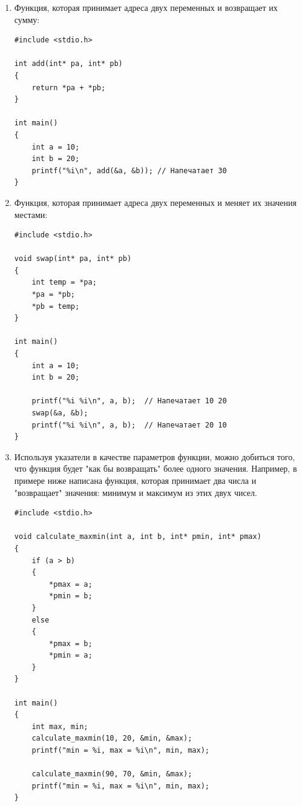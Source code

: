 \documentclass[10pt]{article}
\begin{document}
\begin{enumerate}

\item Функция, которая принимает адреса двух переменных и возвращает их сумму:
\begin{lstlisting}
#include <stdio.h>

int add(int* pa, int* pb)
{
    return *pa + *pb;
}

int main()
{
    int a = 10;
    int b = 20;
    printf("%i\n", add(&a, &b)); // Напечатает 30
}
\end{lstlisting}


\item Функция, которая принимает адреса двух переменных и меняет их значения местами:
\begin{lstlisting}
#include <stdio.h>

void swap(int* pa, int* pb)
{
    int temp = *pa;
    *pa = *pb;
    *pb = temp;
}

int main()
{
    int a = 10;
    int b = 20;

    printf("%i %i\n", a, b);  // Напечатает 10 20
    swap(&a, &b);
    printf("%i %i\n", a, b);  // Напечатает 20 10
}
\end{lstlisting}

\item Используя указатели в качестве параметров функции, можно добиться того, что функция будет "как бы возвращать" \space более одного значения. Например, в примере ниже написана функция, которая принимает два числа и "возвращает"  значения: минимум и максимум из этих двух чисел.

\begin{lstlisting}
#include <stdio.h>

void calculate_maxmin(int a, int b, int* pmin, int* pmax)
{
    if (a > b)
    {
        *pmax = a;
        *pmin = b;
    }
    else
    {
        *pmax = b;
        *pmin = a;
    }
}

int main()
{
    int max, min;
    calculate_maxmin(10, 20, &min, &max);
    printf("min = %i, max = %i\n", min, max);

    calculate_maxmin(90, 70, &min, &max);
    printf("min = %i, max = %i\n", min, max);
}
\end{lstlisting}
\end{enumerate}
\end{document}
